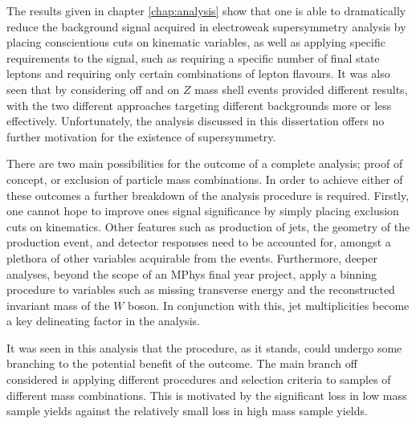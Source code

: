 The results given in chapter \ref{chap:analysis} show that one is able to dramatically reduce the background signal acquired in electroweak supersymmetry analysis by placing conscientious cuts on kinematic variables, as well as applying specific requirements to the signal, such as requiring a specific number of final state leptons and requiring only certain combinations of lepton flavours.
It was also seen that by considering off and on $Z$ mass shell events provided different results, with the two different approaches targeting different backgrounds more or less effectively.
Unfortunately, the analysis discussed in this dissertation offers no further motivation for the existence of supersymmetry.



There are two main possibilities for the outcome of a complete analysis; proof of concept, or exclusion of particle mass combinations.
In order to achieve either of these outcomes a further breakdown of the analysis procedure is required.
Firstly, one cannot hope to improve ones signal significance by simply placing exclusion cuts on kinematics.
Other features such as production of jets, the geometry of the production event, and detector responses need to be accounted for, amongst a plethora of other variables acquirable from the events. 
Furthermore, deeper analyses, beyond the scope of an MPhys final year project, apply a binning procedure to variables such as missing transverse energy and the reconstructed invariant mass of the $W$ boson.
In conjunction with this, jet multiplicities become a key delineating factor in the analysis.



It was seen in this analysis that the procedure, as it stands, could undergo some branching to the potential benefit of the outcome.
The main branch off considered is applying different procedures and selection criteria to samples of different mass combinations.
This is motivated by the significant loss in low mass sample yields against the relatively small loss in high mass sample yields.